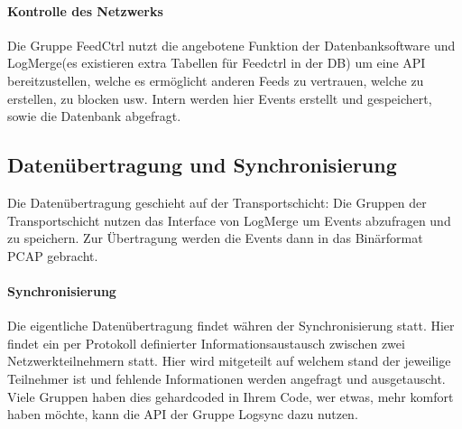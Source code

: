 \documentclass[a4paper, fontsize=9pt, oneside, headsepline=.5pt,footsepline=.5pt]{scrartcl}
\begin{document}
\paragraph{Kontrolle des Netzwerks}
Die Gruppe FeedCtrl nutzt die angebotene Funktion der Datenbanksoftware und LogMerge(es existieren extra Tabellen für Feedctrl in der DB) um eine API bereitzustellen, welche es ermöglicht anderen Feeds zu vertrauen, welche zu erstellen, zu blocken usw. Intern werden hier Events erstellt und gespeichert, sowie die Datenbank abgefragt.

\subsection{Datenübertragung und Synchronisierung}
Die Datenübertragung geschieht auf der Transportschicht: Die Gruppen der Transportschicht nutzen das Interface von LogMerge um Events abzufragen und zu speichern. Zur Übertragung werden die Events dann in das Binärformat PCAP gebracht.

\paragraph{Synchronisierung}
Die eigentliche Datenübertragung findet währen der Synchronisierung statt. Hier findet ein per Protokoll definierter Informationsaustausch zwischen zwei Netzwerkteilnehmern statt. Hier wird mitgeteilt auf welchem stand der jeweilige Teilnehmer ist und fehlende Informationen werden angefragt und ausgetauscht. 
Viele Gruppen haben dies gehardcoded in Ihrem Code, wer etwas, mehr komfort haben möchte, kann die API der Gruppe Logsync dazu nutzen.
\end{document}
